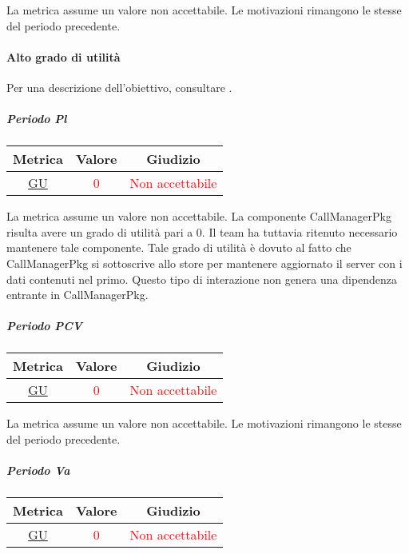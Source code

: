 				La metrica assume un valore non accettabile. Le motivazioni rimangono le stesse del periodo precedente.
				
				\newpage
				\paragraph{Alto grado di utilità}
					Per una descrizione dell'obiettivo, consultare .
					\subparagraph{Periodo Pl}
					
					\begin{table}[H]
						\centering
						\begin{tabular}{  c | c | c}
							\hline
							\textbf{Metrica} & \textbf{Valore} & \textbf{Giudizio} \\
							\hline
						 \hyperref[MMC]{GU}   & \textcolor{Red}{0}          & \textcolor{Red}{Non accettabile}  \\ \hline
						\end{tabular} 
					\end{table}
				
		La metrica assume un valore non accettabile. La componente CallManagerPkg risulta avere un
		grado di utilità pari a 0. Il team ha tuttavia ritenuto necessario mantenere tale componente. Tale
		grado di utilità è dovuto al fatto che CallManagerPkg si sottoscrive allo store per mantenere
		aggiornato il server con i dati contenuti nel primo. Questo tipo di interazione non genera una
		dipendenza entrante in CallManagerPkg.
				
	
				\subparagraph{Periodo PCV}
				
				\begin{table}[H]
					\centering
					\begin{tabular}{  c | c | c}
						\hline
						\textbf{Metrica} & \textbf{Valore} & \textbf{Giudizio} \\
						\hline
						\hyperref[MMC]{GU}   & \textcolor{Red}{0}          & \textcolor{Red}{Non accettabile}  \\ \hline
					\end{tabular} 
				\end{table}
				
				La metrica assume un valore non accettabile. Le motivazioni rimangono le stesse del periodo precedente.
				
				\subparagraph{Periodo Va}
				
				\begin{table}[H]
					\centering
					\begin{tabular}{  c | c | c}
						\hline
						\textbf{Metrica} & \textbf{Valore} & \textbf{Giudizio} \\
						\hline
						\hyperref[MMC]{GU}   & \textcolor{Red}{0}          & \textcolor{Red}{Non accettabile}  \\ \hline
					\end{tabular} 
				\end{table}
				
